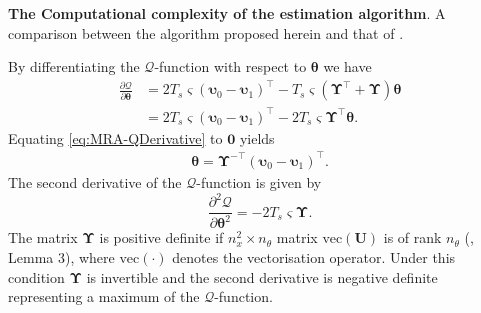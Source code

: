 \documentclass[11pt,draftcls,onecolumn,peerreview]{IEEEtran}
\begin{document}
\begin {table}
\begin{center}
 \caption {{\bf The Computational complexity of the estimation algorithm}. A comparison between the algorithm proposed herein and that of \cite{Dewar2009}.} 
\label{table:MRA-ComputationalComplexity}
\end{center}
\end {table}

By differentiating the $\mathcal Q$-function with respect to $\boldsymbol\theta$ we have
\begin{align}\label{eq:MRA-QDerivative}
\frac{\partial \mathcal Q}{\partial \boldsymbol\theta}&=2T_s\varsigma(\boldsymbol\upsilon_0-\boldsymbol\upsilon_1)^\top-T_s\varsigma(\boldsymbol\Upsilon^\top+\boldsymbol\Upsilon)\boldsymbol\theta \nonumber \\
&=2T_s\varsigma(\boldsymbol\upsilon_0-\boldsymbol\upsilon_1)^\top-2T_s\varsigma\boldsymbol\Upsilon^\top\boldsymbol\theta.
\end{align}
Equating \eqref{eq:MRA-QDerivative} to $\mathbf 0$ yields
\begin{align}\label{eq:MRA-thetahat}
\boldsymbol \theta= \boldsymbol\Upsilon^{-\top}(\boldsymbol\upsilon_0-\boldsymbol\upsilon_1)^\top.
\end{align}
The second derivative of the $\mathcal Q$-function is given by
\begin{equation}
\frac{\partial^2\mathcal Q}{\partial\boldsymbol\theta^2}=-2T_s\varsigma\boldsymbol\Upsilon.
\end{equation}
The matrix $\boldsymbol\Upsilon$ is positive definite if $n_x^2\times n_{\theta}$ matrix $\mathrm{vec}(\mathbf U)$ is of rank $n_{\theta}$ (\cite{Dewar2009}, Lemma 3), where $\mathrm{vec}(\cdot)$ denotes the vectorisation operator. Under this condition $\boldsymbol\Upsilon$ is  invertible and the second derivative is negative definite representing a maximum of the $\mathcal Q$-function. 
\end{document}
